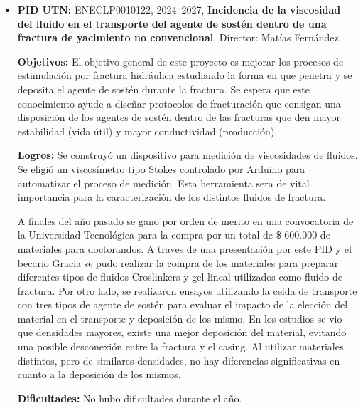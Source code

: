 \documentclass[a4paper,11pt,twoside,final,titlepage,onecolumn,openright]{report}
\begin{document}
\begin{itemize}
	      \textbf{Logros:} Analizando el transporte de material granular en fracturas planas, se compararon mezclas binarias con sistemas monodispersos, manteniendo siempre el mismo diámetro promedio para aislar el efecto de la variedad dimensional. Los resultados revelan que la permeabilidad y la conductividad permanecen prácticamente inalteradas, incluso cuando existe una mezcla de diferentes medidas. Sin embargo, el análisis destaca que las partículas de mayor tamaño soportan tensiones mecánicas superiores, lo que las vuelve más vulnerables al aplastamiento. Como conclusión, el estudio sugiere que aumentar el tamaño medio de los granos es más efectivo para mejorar el flujo que intentar reducir la dispersión de sus dimensiones. Respecto del análisis de amortiguadores granulares, se completó la fase de desarrollo de un prototipo experimental para el estudio del efecto de la forma del contenedor en la respuesta mecánica del sistema vibrante.

	      \textbf{Dificultades:} No se presentaron dificultades durante el año 2025.

	\item \textbf{PID UTN:} ENECLP0010122, 2024--2027, \textbf{Incidencia de la viscosidad del fluido en el transporte del agente de sostén dentro de una fractura de yacimiento no convencional}. Director: Matías Fernández. 

	      \textbf{Objetivos:} El objetivo general de este proyecto es mejorar los procesos de estimulación por fractura hidráulica estudiando la forma en que penetra y se deposita el agente de sostén durante la fractura. Se espera que este conocimiento ayude a diseñar protocolos de fracturación que consigan una disposición de los agentes de sostén dentro de las fracturas que den mayor estabilidad (vida útil) y mayor conductividad (producción).

	      \textbf{Logros:} Se construyó un dispositivo para medición de viscosidades de fluidos. Se eligió un viscosímetro tipo Stokes controlado por Arduino para automatizar el proceso de medición. Esta herramienta sera de vital importancia para la caracterización de los distintos fluidos de fractura.

A finales del año pasado se gano por orden de merito en una convocatoria de la Universidad Tecnológica para la compra por un total de \$ 600.000 de materiales para doctorandos. A traves de una presentación por este PID y el becario Gracia se pudo realizar la compra de los materiales para preparar diferentes tipos de fluidos Croslinkers y gel lineal utilizados como fluido de fractura.  
Por otro lado, se realizaron ensayos utilizando la celda de transporte con tres tipos de agente de sostén para evaluar el impacto de la elección del material en el transporte y deposición de los mismo. En los estudios se vio que densidades mayores, existe una mejor deposición del material, evitando una posible desconexión entre la fractura y el casing. Al utilizar materiales distintos, pero de similares densidades, no hay diferencias significativas en cuanto a la deposición de los mismos.  

	      \textbf{Dificultades:} No hubo dificultades durante el año.

\end{itemize}
\end{document}
